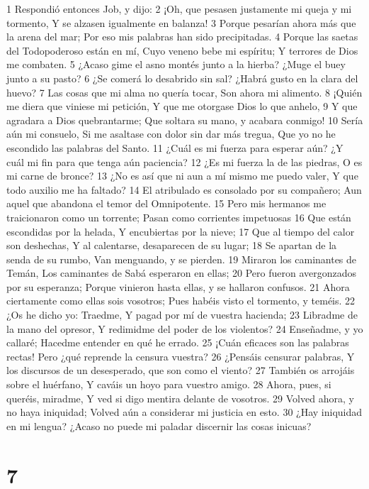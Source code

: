 1 Respondió entonces Job, y dijo:
2 ¡Oh, que pesasen justamente mi queja y mi tormento,
Y se alzasen igualmente en balanza!
3 Porque pesarían ahora más que la arena del mar;
Por eso mis palabras han sido precipitadas.
4 Porque las saetas del Todopoderoso están en mí,
Cuyo veneno bebe mi espíritu;
Y terrores de Dios me combaten.
5 ¿Acaso gime el asno montés junto a la hierba?
¿Muge el buey junto a su pasto?
6 ¿Se comerá lo desabrido sin sal?
¿Habrá gusto en la clara del huevo?
7 Las cosas que mi alma no quería tocar,
Son ahora mi alimento.
8 ¡Quién me diera que viniese mi petición,
Y que me otorgase Dios lo que anhelo,
9 Y que agradara a Dios quebrantarme;
Que soltara su mano, y acabara conmigo! 
10 Sería aún mi consuelo,
Si me asaltase con dolor sin dar más tregua,
Que yo no he escondido las palabras del Santo.
11 ¿Cuál es mi fuerza para esperar aún?
¿Y cuál mi fin para que tenga aún paciencia? 
12 ¿Es mi fuerza la de las piedras,
O es mi carne de bronce?
13 ¿No es así que ni aun a mí mismo me puedo valer,
Y que todo auxilio me ha faltado?
14 El atribulado es consolado por su compañero;
Aun aquel que abandona el temor del Omnipotente. 
15 Pero mis hermanos me traicionaron como un torrente;
Pasan como corrientes impetuosas
16 Que están escondidas por la helada,
Y encubiertas por la nieve;
17 Que al tiempo del calor son deshechas,
Y al calentarse, desaparecen de su lugar;
18 Se apartan de la senda de su rumbo,
Van menguando, y se pierden.
19 Miraron los caminantes de Temán,
Los caminantes de Sabá esperaron en ellas;
20 Pero fueron avergonzados por su esperanza;
Porque vinieron hasta ellas, y se hallaron confusos.
21 Ahora ciertamente como ellas sois vosotros;
Pues habéis visto el tormento, y teméis.
22 ¿Os he dicho yo: Traedme,
Y pagad por mí de vuestra hacienda;
23 Libradme de la mano del opresor,  
Y redimidme del poder de los violentos? 
24 Enseñadme, y yo callaré;  
Hacedme entender en qué he errado.  
25 ¡Cuán eficaces son las palabras rectas!  
Pero ¿qué reprende la censura vuestra?  
26 ¿Pensáis censurar palabras,  
Y los discursos de un desesperado, que son como el viento?  
27 También os arrojáis sobre el huérfano,  
Y caváis un hoyo para vuestro amigo.  
28 Ahora, pues, si queréis, miradme,  
Y ved si digo mentira delante de vosotros.  
29 Volved ahora, y no haya iniquidad;  
Volved aún a considerar mi justicia en esto.  
30 ¿Hay iniquidad en mi lengua?  
¿Acaso no puede mi paladar discernir las cosas inicuas?  

\chapter{7}

